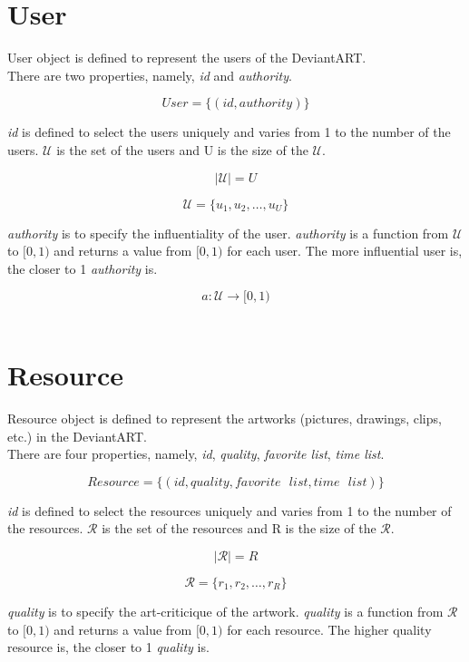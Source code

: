 \documentclass[12pt,a4paper]{report}
\begin{document}
\section{User}

	\hspace{0.6cm}User object is defined to represent the users of the DeviantART.\\
	
	There are two properties, namely, \emph{id} and \emph{authority}. 

	$$User = \{(id, authority)\}$$
	
	\emph{id} is defined to select the users uniquely and varies from 1 to the number of the users. $\mathcal{U}$ is the set of the users and U is the size of the $\mathcal{U}$.

	$$|\mathcal{U}| = U $$

	$$\mathcal{U} = \{u_{1}, u_{2}, \dots, u_{U}\}$$ 

 	\emph{authority} is to specify the influentiality of the user. \emph{authority} is a function from $\mathcal{U}$ to $[0, 1)$ and returns a value from $[0, 1)$ for each user. The more influential user is, the closer to 1 \emph{authority} is.

	$$a : \mathcal{U} \to [0, 1)$$\\	

\section{Resource}

	\hspace{0.6cm}Resource object is defined to represent the artworks (pictures, drawings, clips, etc.) in the DeviantART.\\

	There are four properties, namely, \emph{id}, \emph{quality}, \emph{favorite list}, \emph{time list}. 

	$$Resource = \{(id, quality, favorite \text{ } list,  time \text{ } list)\}$$

	\emph{id} is defined to select the resources uniquely and varies from 1 to the number of the resources. $\mathcal{R}$ is the set of the resources and R is the size of the $\mathcal{R}$.

	$$|\mathcal{R}| = R $$

	$$\mathcal{R} = \{r_{1}, r_{2}, \dots, r_{R}\}$$ 
		

 \emph{quality} is to specify the art-criticique of the artwork. \emph{quality} is a function from $\mathcal{R}$ to $[0, 1)$ and returns a value from $[0, 1)$ for each resource. The higher quality resource is, the closer to 1 \emph{quality} is. 
\end{document}
